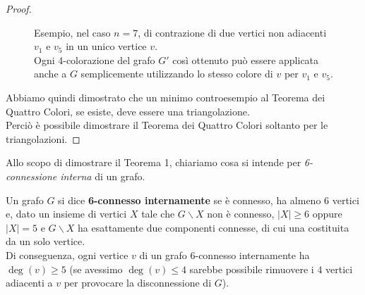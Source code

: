 \documentclass[a4paper,12pt,titlepage]{report}
\begin{document}
\begin{proof}
\begin{figure}[H]
    			\vspace{0.5cm}
    			\caption{Esempio, nel caso $n=7$, di contrazione di due vertici non adiacenti $v_1$ e $v_5$ in un unico vertice $v$.
    			\\Ogni 4-colorazione del grafo $G'$ così ottenuto può essere applicata anche a $G$ semplicemente utilizzando lo stesso colore di $v$ per $v_1$ e $v_5$.}
    		\end{figure}
    	
    	\noindent Abbiamo quindi dimostrato che un minimo controesempio al Teorema dei Quattro Colori, se esiste, deve essere una triangolazione.
    	\\Perciò è possibile dimostrare il Teorema dei Quattro Colori soltanto per le triangolazioni.
    \end{proof}
    Allo scopo di dimostrare il Teorema 1, chiariamo cosa si intende per \emph{6-connessione interna} di un grafo.
    \begin{dfn}
    	Un grafo $G$ si dice {\bfseries 6-connesso internamente} se è connesso, ha almeno 6 vertici e, dato un insieme di vertici $X$ tale che $G \smallsetminus X$ non è connesso, $\lvert X \rvert \geq 6$ oppure $\lvert X \rvert = 5$ e $G \smallsetminus X$ ha esattamente due componenti connesse, di cui una costituita da un solo vertice.
    	\\Di conseguenza, ogni vertice $v$ di un grafo 6-connesso internamente ha $\deg(v) \geq 5$ (se avessimo $\deg(v) \leq 4$ sarebbe possibile rimuovere i $4$ vertici adiacenti a $v$ per provocare la disconnessione di $G$).
    \end{dfn}
\end{document}
